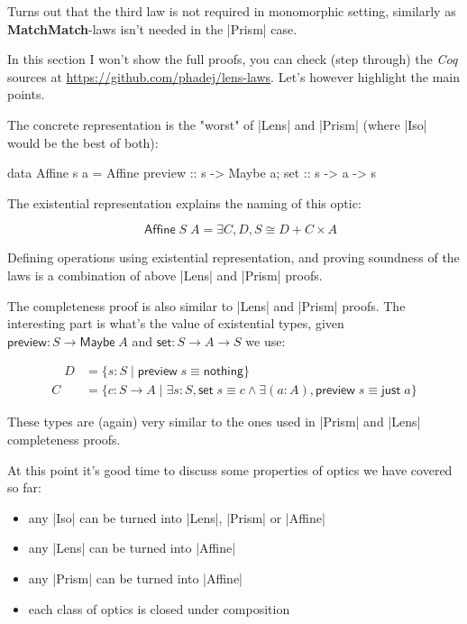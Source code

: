 \documentclass{article}
\begin{document}
Turns out that the third law is not required in monomorphic setting,
similarly as \textbf{MatchMatch}-laws isn't needed in the |Prism| case.

In this section I won't show the full proofs, you can check (step through) the
\emph{Coq} sources at \url{https://github.com/phadej/lens-laws}. Let's however
highlight the main points.

The concrete representation is the "worst" of |Lens| and |Prism|
(where |Iso| would be the best of both):

\begin{code}
data Affine s a = Affine { preview :: s -> Maybe a; set :: s -> a -> s }
\end{code}

The existential representation explains the naming of this optic:

\begin{equation}
\quad \mathsf{Affine}\;S\;A = \exists C, D, S \cong D + C \times A
\end{equation}

Defining operations using existential representation, and proving
soundness of the laws is a combination of above |Lens| and |Prism|
proofs.

The completeness proof is also similar to |Lens| and |Prism| proofs.
The interesting part is what's the value of existential types, given
$\mathsf{preview} : S \to \mathsf{Maybe}\;A$ and
$\mathsf{set} : S \to A \to S$ we use:

\begin{equation}
\begin{aligned}
\quad D &= \{ s : S \mid \mathsf{preview}\;s \equiv \mathsf{nothing} \} \\
      C &= \{ c : S \to A \mid \exists s : S, \mathsf{set}\;s \equiv c \land \exists (a : A), \mathsf{preview}\;s \equiv \mathsf{just}\;a \}
\end{aligned}
\end{equation}

These types are (again) very similar to the ones used in |Prism| and |Lens|
completeness proofs.

At this point it's good time to discuss some properties of optics we have covered so far:
\begin{itemize}
\item any |Iso| can be turned into |Lens|, |Prism| or |Affine|
\item any |Lens| can be turned into |Affine|
\item any |Prism| can be turned into |Affine|
\item each class of optics is closed under composition
\end{itemize}
\end{document}
